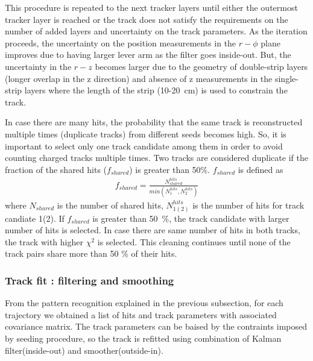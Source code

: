 This procedure is repeated to the next tracker layers until either the 
outermost tracker layer is reached or the track does not satisfy the requirements
on the number of added layers and uncertainty on the track parameters.
As the iteration proceeds, the uncertainty on the position measurements 
in the $r-\phi$ plane improves due to having larger lever arm 
as the filter goes inside-out. But, the uncertainty in the $r-z$ 
becomes larger due to the geometry of double-strip layers
(longer overlap in the z direction) and absence of z measurements 
in the single-strip layers where the length of the strip (10-20~cm) is 
used to constrain the track. 


In case there are many hits, the probability that the same track is reconstructed 
multiple times (duplicate tracks) from different seeds becomes high. 
So, it is important to select only one track candidate among them 
in order to avoid counting charged tracks multiple times. 
Two tracks are considered duplicate if the fraction of the shared hits 
($f_{shared}$) is greater than 50\%.  $f_{shared}$ is defined as 
\begin{eqnarray} 
f_{shared} = \frac{N_{shared}^{hits}}{min (N_1^{hits}, N_2^{hits}) }  
\end{eqnarray}  
where $N_{shared}$ is the number of shared hits, $N_{1(2)}^{hits}$ 
is the number of hits for track candiate 1(2). If $f_{shared}$ is 
greater than 50~\%, the track candidate with larger number of hits is selected. 
In case there are same number of hits in both tracks, the track with higher $\chi^2$
is selected. This cleaning continues until none of the track pairs share more than 
50 \% of their hits.  


\subsubsection{Track fit : filtering and smoothing}

From the pattern recognition explained in the previous subsection, 
for each trajectory we obtained a list of hits and track parameters 
with associated covariance matrix. The track parameters can be baised 
by the contraints imposed by seeding procedure, so the track is refitted 
using combination of Kalman filter(inside-out) and smoother(outside-in). 

